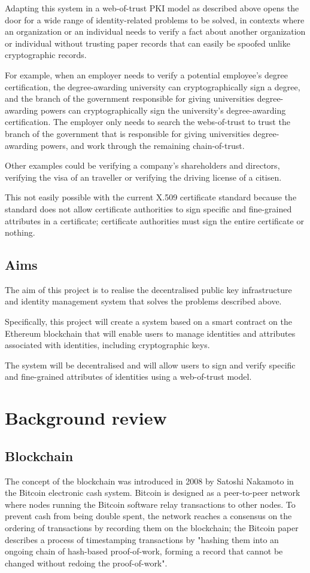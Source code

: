 \documentclass[12pt,a4paper]{report}
\begin{document}
	Adapting this system in a web-of-trust PKI model as described above opens the door for a wide range of identity-related problems to be solved, in contexts where an organization or an individual needs to verify a fact about another organization or individual without trusting paper records that can easily be spoofed unlike cryptographic records.
	
	For example, when an employer needs to verify a potential employee's degree certification, the degree-awarding university can cryptographically sign a degree, and the branch of the government responsible for giving universities degree-awarding powers can cryptographically sign the university's degree-awarding certification. The employer only needs to search the webs-of-trust to trust the branch of the government that is responsible for giving universities degree-awarding powers, and work through the remaining chain-of-trust.
	
	Other examples could be verifying a company's shareholders and directors, verifying the visa of an traveller or verifying the driving license of a citisen.
	
	This not easily possible with the current X.509 certificate standard because the standard does not allow certificate authorities to sign specific and fine-grained attributes in a certificate; certificate authorities must sign the entire certificate or nothing.
	
	
	\section{Aims}
	The aim of this project is to realise the decentralised public key infrastructure and identity management system that solves the problems described above.
	
	Specifically, this project will create a system based on a smart contract on the Ethereum blockchain that will enable users to manage identities and attributes associated with identities, including cryptographic keys.
	
	The system will be decentralised and will allow users to sign and verify specific and fine-grained attributes of identities using a web-of-trust model.
	
	\chapter{Background review}
	\section{Blockchain}
	The	concept of the blockchain was introduced in 2008 by Satoshi Nakamoto in the Bitcoin electronic cash system.\cite{9} Bitcoin is designed as a peer-to-peer network where nodes running the Bitcoin software relay transactions to other nodes. To prevent cash from being double spent, the network reaches a consensus on the ordering of transactions by recording them on the blockchain; the Bitcoin paper describes a process of timestamping transactions by "hashing them into an ongoing chain of hash-based proof-of-work, forming a record that cannot be changed without redoing the proof-of-work".
	
\end{document}

